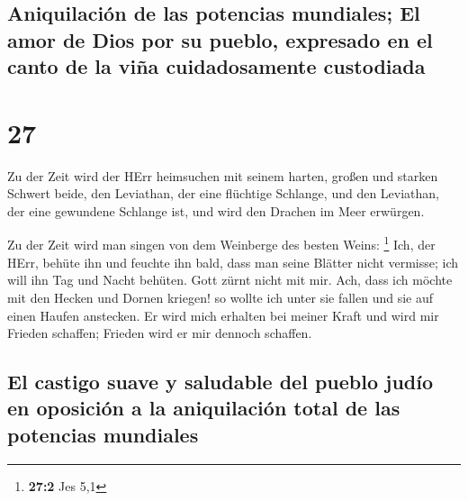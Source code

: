 \hypertarget{aniquilaciuxf3n-de-las-potencias-mundiales-el-amor-de-dios-por-su-pueblo-expresado-en-el-canto-de-la-viuxf1a-cuidadosamente-custodiada}{%
\subsection{Aniquilación de las potencias mundiales; El amor de Dios por
su pueblo, expresado en el canto de la viña cuidadosamente
custodiada}\label{aniquilaciuxf3n-de-las-potencias-mundiales-el-amor-de-dios-por-su-pueblo-expresado-en-el-canto-de-la-viuxf1a-cuidadosamente-custodiada}}

\hypertarget{section-26}{%
\section{27}\label{section-26}}

 Zu der Zeit wird der HErr heimsuchen mit seinem harten,
großen und starken Schwert beide, den Leviathan, der eine flüchtige
Schlange, und den Leviathan, der eine gewundene Schlange ist, und wird
den Drachen im Meer erwürgen.

 Zu der Zeit wird man singen von dem Weinberge des besten
Weins: \footnote{\textbf{27:2} Jes 5,1}  Ich, der HErr,
behüte ihn und feuchte ihn bald, dass man seine Blätter nicht vermisse;
ich will ihn Tag und Nacht behüten.  Gott zürnt nicht mit
mir. Ach, dass ich möchte mit den Hecken und Dornen kriegen! so wollte
ich unter sie fallen und sie auf einen Haufen anstecken. 
Er wird mich erhalten bei meiner Kraft und wird mir Frieden schaffen;
Frieden wird er mir dennoch schaffen.

\hypertarget{el-castigo-suave-y-saludable-del-pueblo-juduxedo-en-oposiciuxf3n-a-la-aniquilaciuxf3n-total-de-las-potencias-mundiales}{%
\subsection{El castigo suave y saludable del pueblo judío en oposición a
la aniquilación total de las potencias
mundiales}\label{el-castigo-suave-y-saludable-del-pueblo-juduxedo-en-oposiciuxf3n-a-la-aniquilaciuxf3n-total-de-las-potencias-mundiales}}

